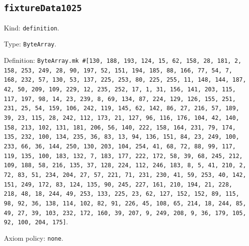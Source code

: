 \documentclass[11pt]{article}
\begin{document}
\subsection*{\texttt{fixtureData1025}}
\noindent Kind: \texttt{definition}.\par
\noindent Type: \texttt{ByteArray}.\par
\noindent Definition: \texttt{ByteArray.mk \#[130, 188, 193, 124, 15, 62, 158, 28, 181, 2, 158, 253, 249, 28, 90, 197, 52, 151, 194, 185, 88, 166, 77, 54, 7, 168, 232, 57, 130, 53, 137, 225, 253, 80, 225, 255, 11, 148, 144, 187, 42, 50, 209, 109, 229, 12, 235, 252, 17, 1, 31, 156, 141, 203, 115, 117, 197, 98, 14, 23, 239, 8, 69, 134, 87, 224, 129, 126, 155, 251, 231, 25, 54, 159, 106, 242, 119, 145, 62, 142, 86, 27, 216, 57, 189, 39, 23, 115, 28, 242, 112, 173, 21, 127, 96, 116, 176, 104, 42, 140, 158, 213, 102, 131, 181, 206, 56, 140, 222, 158, 164, 231, 79, 174, 135, 232, 100, 134, 235, 36, 83, 13, 94, 136, 151, 84, 23, 249, 100, 233, 66, 36, 144, 250, 130, 203, 104, 254, 41, 68, 72, 88, 99, 117, 119, 135, 100, 183, 132, 7, 183, 177, 222, 172, 58, 39, 68, 245, 212, 109, 188, 58, 216, 135, 37, 128, 224, 112, 246, 183, 8, 5, 41, 210, 2, 72, 83, 51, 234, 204, 27, 57, 221, 71, 231, 230, 41, 59, 253, 40, 142, 151, 249, 172, 83, 124, 135, 90, 245, 227, 161, 210, 194, 21, 228, 218, 48, 18, 244, 49, 253, 133, 225, 23, 62, 127, 152, 152, 89, 115, 98, 92, 36, 138, 114, 102, 82, 91, 226, 45, 108, 65, 214, 18, 244, 85, 49, 27, 39, 103, 232, 172, 160, 39, 207, 9, 249, 208, 9, 36, 179, 105, 92, 100, 204, 175]}.\par
\noindent Axiom policy: \texttt{none}.\par
\end{document}
